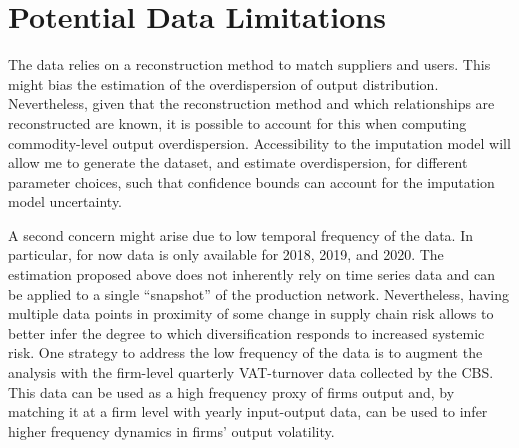\documentclass[american, abstract=on]{scrartcl}
\begin{document}
\section{Potential Data Limitations}

The data relies on a reconstruction method to match suppliers and users. This might bias the estimation of the overdispersion of output distribution. Nevertheless, given that the reconstruction method and which relationships are reconstructed are known, it is possible to account for this when computing commodity-level output overdispersion. Accessibility to the imputation model will allow me to generate the dataset, and estimate overdispersion, for different parameter choices, such that confidence bounds can account for the imputation model uncertainty. 

A second concern might arise due to low temporal frequency of the data. In particular, for now data is only available for 2018, 2019, and 2020. The estimation proposed above does not inherently rely on time series data and can be applied to a single ``snapshot'' of the production network. Nevertheless, having multiple data points in proximity of some change in supply chain risk allows to better infer the degree to which diversification responds to increased systemic risk. One strategy to address the low frequency of the data is to augment the analysis with the firm-level quarterly VAT-turnover data collected by the CBS. This data can be used as a high frequency proxy of firms output and, by matching it at a firm level with yearly input-output data, can be used to infer higher frequency dynamics in firms' output volatility. 

\newpage
\printbibliography
\end{document}
